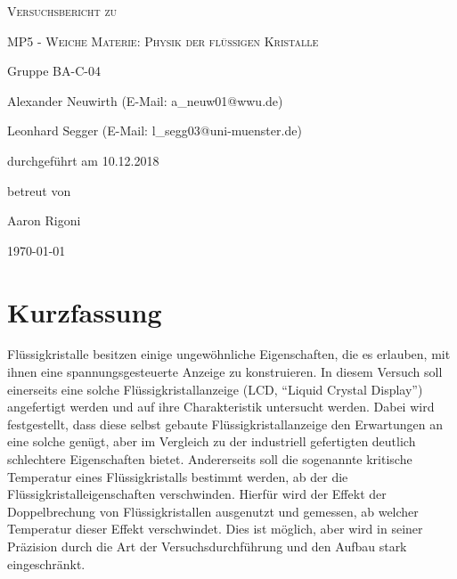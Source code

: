 \documentclass[
	a4paper,
	12pt,
	pagesize,
	ngerman
]{scrartcl}
\begin{document}
	\begin{titlepage}
		\centering
		{\scshape\LARGE Versuchsbericht zu \par}
		\vspace{1cm}
		{\scshape\huge MP5 - Weiche Materie: Physik der
flüssigen Kristalle \par} %
		\vspace{2.5cm}
		{\LARGE Gruppe BA-C-04 \par}
		\vspace{0.5cm}

		{\large Alexander Neuwirth (E-Mail: a\_neuw01@wwu.de) \par}
		{\large Leonhard Segger (E-Mail: l\_segg03@uni-muenster.de) \par}
		\vfill

		durchgeführt am 10.12.2018\par
		betreut von\par
		{\large Aaron Rigoni}

		\vfill

		{\large \today\par}
	\end{titlepage}
	\tableofcontents
	\newpage


	\section{Kurzfassung}
	Flüssigkristalle besitzen einige ungewöhnliche Eigenschaften, die es erlauben, mit ihnen eine spannungsgesteuerte Anzeige zu konstruieren.
	In diesem Versuch soll einerseits eine solche Flüssigkristallanzeige (LCD, \enquote{Liquid Crystal Display}) angefertigt werden und auf ihre Charakteristik untersucht werden.
	Dabei wird festgestellt, dass diese selbst gebaute Flüssigkristallanzeige den Erwartungen an eine solche genügt, aber im Vergleich zu der industriell gefertigten deutlich schlechtere Eigenschaften bietet.
	Andererseits soll die sogenannte kritische Temperatur eines Flüssigkristalls bestimmt werden, ab der die Flüssigkristalleigenschaften verschwinden.
	Hierfür wird der Effekt der Doppelbrechung von Flüssigkristallen ausgenutzt und gemessen, ab welcher Temperatur dieser Effekt verschwindet.
	Dies ist möglich, aber wird in seiner Präzision durch die Art der Versuchsdurchführung und den Aufbau stark eingeschränkt.
\end{document}
